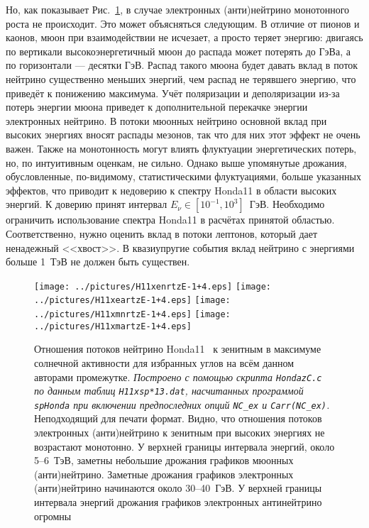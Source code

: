 Но, как показывает Рис.~\ref{Honda11maxrtzE-1+4}, в случае электронных (анти)нейтрино монотонного роста не происходит. \textsf{Это может объясняться следующим. В отличие от пионов и каонов, мюон при взаимодействии не исчезает, а просто теряет энергию: двигаясь по вертикали высокоэнергетичный мюон до распада может потерять до ГэВа, а по горизонтали --- десятки ГэВ. Распад такого мюона будет давать вклад в поток нейтрино существенно меньших энергий, чем распад не терявшего энергию, что приведёт к понижению максимума. {\color{brown}Учёт поляризации и деполяризации из-за потерь энергии мюона приведет к дополнительной перекачке энергии электронных нейтрино.} В потоки мюонных нейтрино основной вклад при высоких энергиях вносят распады мезонов, так что для них этот эффект не очень важен. Также на монотонность могут влиять флуктуации энергетических потерь, но, по интуитивным оценкам, не сильно.} Однако выше упомянутые дрожания, обусловленные, по-видимому, статистическими флуктуациями, {\color{red}больше} указанных эффектов, что приводит к недоверию к спектру Honda11 в области высоких энергий. {\color{blue}К доверию принят интервал $E_{\nu}\in[10^{-1},10^{3}]$~ГэВ.} {\color{MYgreen}Необходимо ограничить использование спектра Honda11 в расчётах принятой областью. Соответственно, нужно оценить вклад в потоки лептонов, который дает ненадежный <<хвост>>.} В квазиупругие события вклад нейтрино с энергиями больше 1~ТэВ не должен быть существен.
\begin{figure}[!ht]
\texttt{[image: ../pictures/H11xenrtzE-1+4.eps]}
\texttt{[image: ../pictures/H11xeartzE-1+4.eps]}
\texttt{[image: ../pictures/H11xmnrtzE-1+4.eps]}
\texttt{[image: ../pictures/H11xmartzE-1+4.eps]}
\caption{Отношения потоков нейтрино Honda11~\cite{Honda:2011nf} к зенитным в максимуме солнечной активности для избранных углов на всём данном авторами промежутке. \textit{Построено с помощью скрипта \texttt{HondazC.c} по данным таблиц \texttt{H11xsp*13.dat}, насчитанных программой \texttt{spHonda} при включении предпоследних опций \texttt{NC\_ex} и \texttt{Carr(NC\_ex)}.} {\color{magenta}Неподходящий для печати формат.} Видно, что отношения потоков электронных (анти)нейтрино к зенитным при высоких энергиях не возрастают монотонно. У верхней границы интервала энергий, около 5--6~ТэВ, заметны небольшие дрожания графиков мюонных (анти)нейтрино. Заметные дрожания графиков электронных (анти)нейтрино начинаются около 30--40~ГэВ. У верхней границы интервала энергий дрожания графиков электронных антинейтрино огромны}
\label{Honda11maxrtzE-1+4}
\end{figure}

